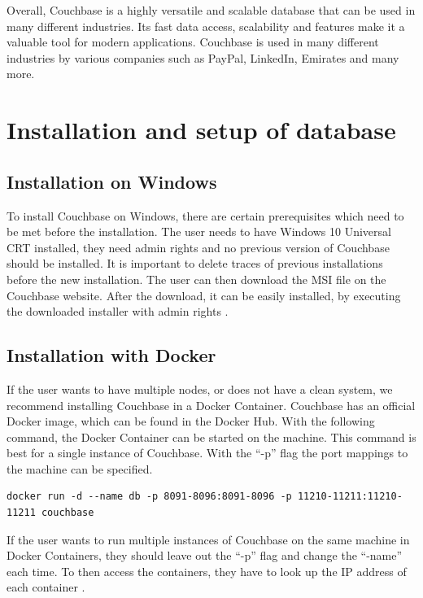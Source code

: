 Overall, Couchbase is a highly versatile and scalable database that can be used in many different industries. Its fast data access, scalability and features make it a valuable tool for modern applications. Couchbase is used in many different industries by various companies such as PayPal, LinkedIn, Emirates and many more.


\section{Installation and setup of database}

\subsection{Installation on Windows}
To install Couchbase on Windows, there are certain prerequisites which need to be met before the installation. The user needs to have Windows 10 Universal CRT installed, they need admin rights and no previous version of Couchbase should be installed. It is important to delete traces of previous installations before the new installation. The user can then download the MSI file on the Couchbase website. After the download, it can be easily installed, by executing the downloaded installer with admin rights \parencite{Couchbase.20230318}.

\subsection{Installation with Docker}
If the user wants to have multiple nodes, or does not have a clean system, we recommend installing Couchbase in a Docker Container. Couchbase has an official Docker image, which can be found in the Docker Hub. With the following command, the Docker Container can be started on the machine. This command is best for a single instance of Couchbase. With the ``-p'' flag the port mappings to the machine can be specified.

\begin{lstlisting}
docker run -d --name db -p 8091-8096:8091-8096 -p 11210-11211:11210-11211 couchbase
\end{lstlisting}

If the user wants to run multiple instances of Couchbase on the same machine in Docker Containers, they should leave out the ``-p'' flag and change the ``-name'' each time. To then access the containers, they have to look up the \ac{IP} address of each container \parencite{Couchbase.20230318b}.

